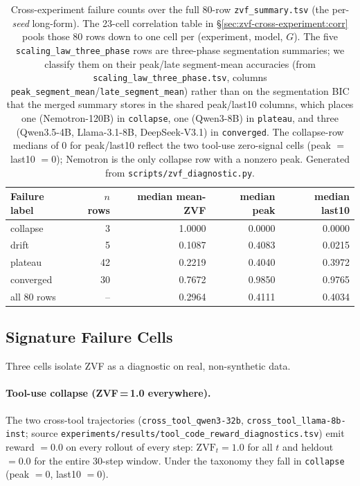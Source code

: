 \documentclass{article}
\begin{document}
\begin{table}[ht]
\centering
\small
\begin{tabular}{lrrrr}
\toprule
Failure label & $n$ rows & median mean-ZVF & median peak & median last10 \\
\midrule
collapse  &  3 & 1.0000 & 0.0000 & 0.0000 \\
drift     &  5 & 0.1087 & 0.4083 & 0.0215 \\
plateau   & 42 & 0.2219 & 0.4040 & 0.3972 \\
converged & 30 & 0.7672 & 0.9850 & 0.9765 \\
\midrule
all 80 rows & -- & 0.2964 & 0.4111 & 0.4034 \\
\bottomrule
\end{tabular}
\caption{Cross-experiment failure counts over the full 80-row
\texttt{zvf\_summary.tsv} (the per-\emph{seed} long-form). The
23-cell correlation table in \S\ref{sec:zvf-cross-experiment:corr}
pools those 80 rows down to one cell per (experiment, model, $G$).
The five \texttt{scaling\_law\_three\_phase} rows are three-phase
segmentation summaries; we classify them on their peak/late
segment-mean accuracies (from
\texttt{scaling\_law\_three\_phase.tsv}, columns
\texttt{peak\_segment\_mean}/\texttt{late\_segment\_mean}) rather than
on the segmentation BIC that the merged summary stores in the shared
peak/last10 columns, which places one (Nemotron-120B) in
\texttt{collapse}, one (Qwen3-8B) in \texttt{plateau}, and three
(Qwen3.5-4B, Llama-3.1-8B, DeepSeek-V3.1) in \texttt{converged}. The
collapse-row medians of $0$ for peak/last10 reflect the two tool-use
zero-signal cells (peak $=$ last10 $= 0$); Nemotron is the only
collapse row with a nonzero peak. Generated from
\texttt{scripts/zvf\_diagnostic.py}.}
\label{tab:zvf-failure-counts}
\end{table}

\subsection{Signature Failure Cells}

Three cells isolate ZVF as a diagnostic on real, non-synthetic data.

\paragraph{Tool-use collapse (ZVF\,=\,1.0 everywhere).}
The two cross-tool trajectories (\texttt{cross\_tool\_qwen3-32b},
\texttt{cross\_tool\_llama-8b-inst}; source
\texttt{experiments/results/tool\_code\_reward\_diagnostics.tsv})
emit reward $= 0.0$ on every rollout of every step: $\mathrm{ZVF}_t
= 1.0$ for all $t$ and heldout $= 0.0$ for the entire
30-step window. Under the taxonomy they fall in
\texttt{collapse} (peak $= 0$, last10 $= 0$).
\end{document}
